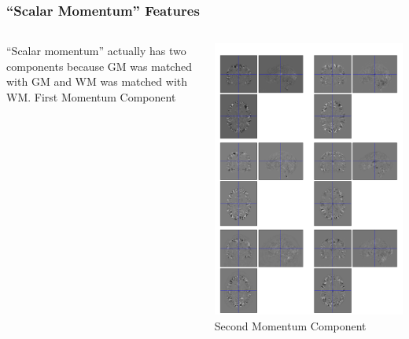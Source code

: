 \begin{frame}
\frametitle{``Scalar Momentum'' Features}
\begin{columns}[c]
``Scalar momentum'' actually has two components because GM was matched with GM and WM was matched with WM.
First Momentum Component

\includegraphics[width=1\textwidth]{resids1_ixi}
Second Momentum Component


\end{columns}
\end{frame}
